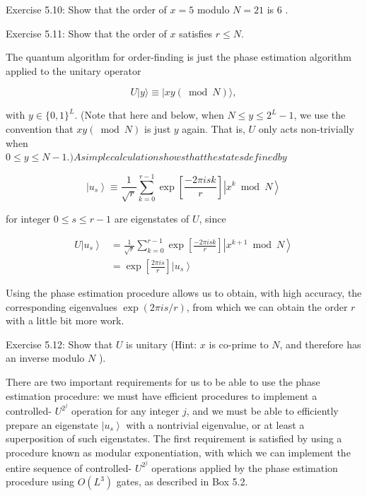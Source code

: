 Exercise 5.10: Show that the order of $x=5$ modulo $N=21$ is 6 .

Exercise 5.11: Show that the order of $x$ satisfies $r \leq N$.

The quantum algorithm for order-finding is just the phase estimation algorithm applied to the unitary operator

\begin{equation}
    U|y\rangle \equiv|x y(\bmod N)\rangle, \tag{5.36}
\end{equation}

with $y \in\{0,1\}^{L}$. (Note that here and below, when $N \leq y \leq 2^{L}-1$, we use the convention that $x y(\bmod N)$ is just $y$ again. That is, $U$ only acts non-trivially when\\
$0 \leq y \leq N-1$.$) A simple calculation shows that the states defined by$

\begin{equation}
    \left|u_{s}\right\rangle \equiv \frac{1}{\sqrt{r}} \sum_{k=0}^{r-1} \exp \left[\frac{-2 \pi i s k}{r}\right]\left|x^{k} \bmod N\right\rangle \tag{5.37}
\end{equation}

for integer $0 \leq s \leq r-1$ are eigenstates of $U$, since

\begin{align}
U\left|u_{s}\right\rangle & =\frac{1}{\sqrt{r}} \sum_{k=0}^{r-1} \exp \left[\frac{-2 \pi i s k}{r}\right]\left|x^{k+1} \bmod N\right\rangle  \tag{5.38}\\
& =\exp \left[\frac{2 \pi i s}{r}\right]\left|u_{s}\right\rangle  \tag{5.39}
\end{align}

Using the phase estimation procedure allows us to obtain, with high accuracy, the corresponding eigenvalues $\exp (2 \pi i s / r)$, from which we can obtain the order $r$ with a little bit more work.

Exercise 5.12: Show that $U$ is unitary (Hint: $x$ is co-prime to $N$, and therefore has an inverse modulo $N$ ).

There are two important requirements for us to be able to use the phase estimation procedure: we must have efficient procedures to implement a controlled- $U^{2^{j}}$ operation for any integer $j$, and we must be able to efficiently prepare an eigenstate $\left|u_{s}\right\rangle$ with a nontrivial eigenvalue, or at least a superposition of such eigenstates. The first requirement is satisfied by using a procedure known as modular exponentiation, with which we can implement the entire sequence of controlled- $U^{2^{j}}$ operations applied by the phase estimation procedure using $O\left(L^{3}\right)$ gates, as described in Box 5.2.

